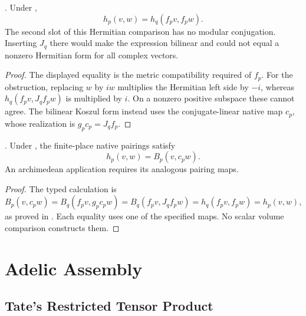 \begin{proposition}
\label{v4-arith:kp:prop:Pet-p-is-BC-sigma}
\ClaimStatusProvedHereConditional. Under
,
\begin{equation}
 h_p(v,w)=h_q(f_pv,f_pw).
 \label{v4-arith:kp:eq:Pet-p-match}
\end{equation}
The second slot of this Hermitian comparison has no modular
conjugation. Inserting $J_q$ there would make the expression
bilinear and could not equal a nonzero Hermitian form for all
complex vectors.
\end{proposition}
\begin{proof}
The displayed equality is the metric compatibility required of
$f_p$. For the obstruction, replacing $w$ by $iw$ multiplies
the Hermitian left side by $-i$, whereas
$h_q(f_pv,J_qf_pw)$ is multiplied by $i$. On a nonzero positive
subspace these cannot agree. The bilinear Koszul form instead
uses the conjugate-linear native map $c_p$, whose realization
is $g_pc_p=J_qf_p$.
\end{proof}

\begin{corollary}
\label{v4-arith:kp:cor:local-compatibility}
\ClaimStatusProvedHereConditional. Under
, the finite-place
native pairings satisfy
\begin{equation}
 h_p(v,w)=B_p(v,c_pw).
 \label{v4-arith:kp:eq:local-compatibility}
\end{equation}
An archimedean application requires its analogous pairing maps.
\end{corollary}
\begin{proof}
The typed calculation is
$B_p(v,c_pw)=B_q(f_pv,g_pc_pw)=B_q(f_pv,J_qf_pw)
=h_q(f_pv,f_pw)=h_p(v,w)$, as proved in
. Each equality uses one
of the specified maps. No scalar volume comparison constructs
them.
\end{proof}

\section{Adelic Assembly}
\label{v4-arith:kp:adelic}

\subsection{Tate's Restricted Tensor Product}
\label{v4-arith:kp:adelic:restricted-tensor}

